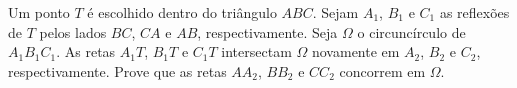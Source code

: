 Um ponto $T$ é escolhido dentro do triângulo $ABC$.
Sejam $A_1$, $B_1$ e $C_1$ as reflexões de $T$ pelos lados $BC$, $CA$ e $AB$, respectivamente.
Seja $\Omega$ o circuncírculo de $A_1B_1C_1$.
As retas $A_1T$, $B_1T$ e $C_1T$ intersectam $\Omega$ novamente em $A_2$, $B_2$ e $C_2$, respectivamente.
Prove que as retas $AA_2$, $BB_2$ e $CC_2$ concorrem em $\Omega$.
